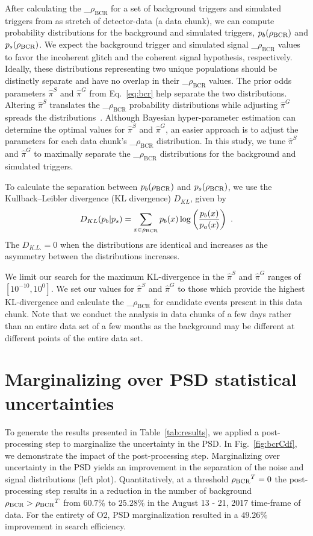 \documentclass[useAMS,fleqn, usenatbib, final]{mnras}
\newcommand{\mathcmd}[1]{{\sc \relax\ifmmode#1\else $#1$\fi}\xspace}
\newcommand{\bcr}{\mathcmd{\rho_\text{BCR}}}
\begin{document}
After calculating the \bcr for a set of background triggers and simulated triggers from as stretch of detector-data (a data chunk), we can compute probability distributions for the background and simulated triggers, $p_b(\bcr)$ and $p_s(\bcr)$. We expect the background trigger and simulated signal \bcr values to favor the incoherent glitch and the coherent signal hypothesis, respectively. Ideally, these distributions representing two unique populations should be distinctly separate and have no overlap in their \bcr values. The prior odds parameters $\hat{\pi}^S$ and $\hat{\pi}^G$ from Eq.~\ref{eq:bcr} help separate the two distributions. Altering $\hat{\pi}^S$ translates the \bcr probability distributions while adjusting $\hat{\pi}^G$ spreads the distributions~\citep[see][Appendix A]{BCR1}. Although Bayesian hyper-parameter estimation can determine the optimal values for $\hat{\pi}^S$ and $\hat{\pi}^G$, an easier approach is to adjust the parameters for each data chunk's \bcr distribution. In this study, we tune $\hat{\pi}^S$ and $\hat{\pi}^G$ to maximally separate the \bcr distributions for the background and simulated triggers. 

To calculate the separation between $p_b(\bcr)$ and $p_s(\bcr)$, we use the Kullback--Leibler divergence (KL divergence) $D_{KL}$, given by
\begin{equation}
    D_{KL}(p_b | p_s) = \sum\limits_{x\in \bcr} p_b(x) \log \left( \frac{p_b(x)}{p_a(x)} \right)  \ .
\end{equation}
The $D_{K.L.}=0$ when the distributions are identical and increases as the asymmetry between the distributions increases. 

We limit our search for the maximum KL-divergence in the $\hat{\pi}^S$ and $\hat{\pi}^G$ ranges of $[10^{-10}, 10^0]$. We set our values for $\hat{\pi}^S$ and $\hat{\pi}^G$ to those which provide the highest KL-divergence and calculate the \bcr for candidate events present in this data chunk. Note that we conduct the analysis in data chunks of a few days rather than an entire data set of a few months as the background may be different at different points of the entire data set.



\section{Marginalizing over PSD statistical uncertainties}\label{sec:psd-marginalization}
To generate the results presented in Table~\ref{tab:results}, we applied a post-processing step to marginalize the uncertainty in the PSD. In Fig.~\ref{fig:bcrCdf}, we demonstrate the impact of the post-processing step. Marginalizing over uncertainty in the PSD yields an improvement in the separation of the noise and signal distributions (left plot). Quantitatively, at a threshold $\bcr^T=0$ the post-processing step results in a reduction in the number of background $\bcr > \bcr^T$ from $60.7\%$ to $25.28\%$ in the August 13 - 21, 2017 time-frame of data. For the entirety of O2, PSD marginalization resulted in a $49.26\%$ improvement in search efficiency. 
\end{document}
